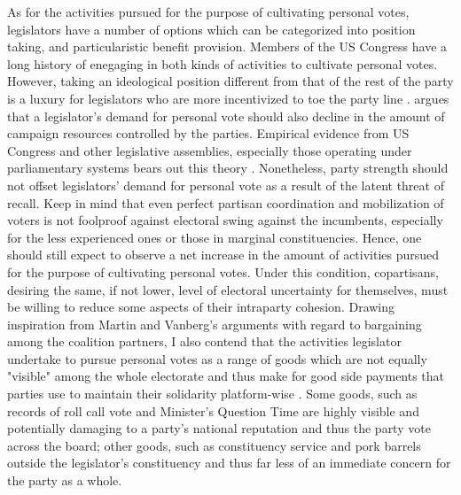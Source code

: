 \documentclass[hyphens, crop=false]{standalone}
\begin{document}
		As for the activities pursued for the purpose of cultivating personal votes,
		legislators have a number of options which can be categorized into position taking,
		and particularistic benefit provision.
		Members of the US Congress have a long history of enegaging in both kinds of activities to cultivate personal votes.
		However,
		taking an ideological position different from that of the rest of the party is a luxury for legislators who are more incentivized to toe the party line
		\autocite{kamPartyDiscipline2014}.
		\citeauthor{mayhewCongressElectoralConnection1974}
		\autocite*{mayhewCongressElectoralConnection1974}
		argues that a legislator's demand for personal vote should also decline in the amount of campaign resources controlled by the parties.
		Empirical evidence from US Congress and other legislative assemblies,
		especially those operating under parliamentary systems bears out this theory
		\autocite{rohdePartiesLeadersPostreform1991,coxLegislativeLeviathanParty2007,careyLegislativeVotingAccountability2008,depauwLegislativePartyDiscipline2009}.
		Nonetheless,
		party strength should not offset legislators' demand for personal vote as a result of the latent threat of recall.
		Keep in mind that even perfect partisan coordination and mobilization of voters is not foolproof against electoral swing against the incumbents,
		especially for the less experienced ones or those in marginal constituencies.
		Hence,
		one should still expect to observe a net increase in the amount of activities pursued for the purpose of cultivating personal votes.
		Under this condition,
		copartisans,
		desiring the same,
		if not lower,
		level of electoral uncertainty for themselves,
		must be willing to reduce some aspects of their intraparty cohesion.
		Drawing inspiration from Martin and Vanberg's
		\autocite*{martinCoalitionGovernmentLegislative2020}
		arguments with regard to bargaining among the coalition partners,
		I also contend that the activities legislator undertake to pursue personal votes as a range of goods which are not equally "visible" among the whole electorate and thus make for good side payments that parties use to maintain their solidarity platform-wise
		\autocite
		{coxSettingAgendaResponsible2005,jenkinsBuyingNegativeAgenda2012}.
		Some goods,
		such as records of roll call vote and Minister's Question Time are highly visible and potentially damaging to a party's national reputation and thus the party vote across the board; other goods,
		such as constituency service and pork barrels outside the legislator's constituency and thus far less of an immediate concern for the party as a whole.
\end{document}
